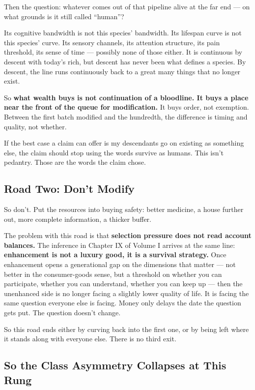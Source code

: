 \documentclass[11pt,a4paper]{article}
\begin{document}
Then the question: whatever comes out of that pipeline alive at the far end --- on what grounds is it still called ``human''?

Its cognitive bandwidth is not this species' bandwidth. Its lifespan curve is not this species' curve. Its sensory channels, its attention structure, its pain threshold, its sense of time --- possibly none of those either. It is continuous by descent with today's rich, but descent has never been what defines a species. By descent, the line runs continuously back to a great many things that no longer exist.

So \textbf{what wealth buys is not continuation of a bloodline. It buys a place near the front of the queue for modification.} It buys order, not exemption. Between the first batch modified and the hundredth, the difference is timing and quality, not whether.

If the best case a claim can offer is my descendants go on existing as something else, the claim should stop using the words survive as humans. This isn't pedantry. Those are the words the claim chose.

\subsection{Road Two: Don't Modify}

So don't. Put the resources into buying safety: better medicine, a house further out, more complete information, a thicker buffer.

The problem with this road is that \textbf{selection pressure does not read account balances.} The inference in Chapter IX of Volume I arrives at the same line: \textbf{enhancement is not a luxury good, it is a survival strategy.} Once enhancement opens a generational gap on the dimensions that matter --- not better in the consumer-goods sense, but a threshold on whether you can participate, whether you can understand, whether you can keep up --- then the unenhanced side is no longer facing a slightly lower quality of life. It is facing the same question everyone else is facing. Money only delays the date the question gets put. The question doesn't change.

So this road ends either by curving back into the first one, or by being left where it stands along with everyone else. There is no third exit.

\subsection{So the Class Asymmetry Collapses at This Rung}
\end{document}
